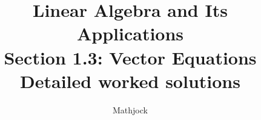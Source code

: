 
\title{\textbf{Linear Algebra and Its Applications}\\[0.3em]Section 1.3: Vector Equations\\[0.3em]\large Detailed worked solutions}
\author{Mathjock}
\date{}

\maketitle
\bookinfo
\tableofcontents
\clearpage
\renewcommand{\thesection}{1.\arabic{section}}
\renewcommand{\theHsection}{1.\arabic{section}}
\setcounter{section}{2}


